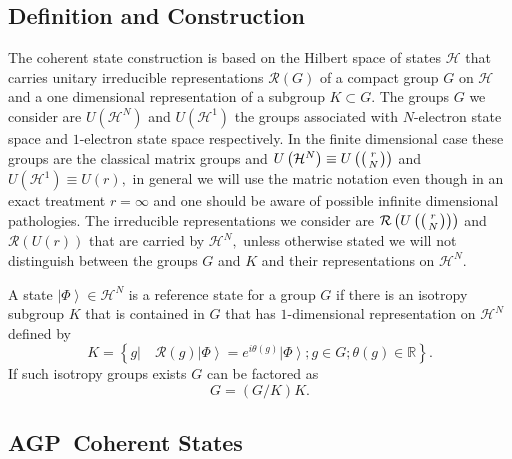 \documentclass[aps,preprint]{revtex4}%
\begin{document}
\subsection{Definition and Construction\label{def}}

The coherent state construction is based on the Hilbert space of states
$\mathcal{H}$ that carries unitary irreducible representations $\mathcal{R}%
\left(  G\right)  $ of a compact group $G$ on $\mathcal{H}$ and a one
dimensional representation of a subgroup $K\subset G$. The groups $G$ we
consider are $U\left(  \mathcal{H}^{N}\right)  $ and $U\left(  \mathcal{H}%
^{1}\right)  $ the groups associated with $N$-electron state space and
$1$-electron state space respectively. In the finite dimensional case these
groups are the classical matrix groups and $U\left(  \mathcal{H}^{N}\right)
\equiv U\left(  \left(
\genfrac{}{}{0pt}{}{r}{N}%
\right)  \right)  $ and $U\left(  \mathcal{H}^{1}\right)  \equiv U\left(
r\right)  ,$ in general we will use the matric notation even though in an
exact treatment $r=\infty$ and one should be aware of possible infinite
dimensional pathologies. The irreducible representations we consider are
$\mathcal{R}\left(  U\left(  \left(
\genfrac{}{}{0pt}{}{r}{N}%
\right)  \right)  \right)  $ and $\mathcal{R}\left(  U\left(  r\right)
\right)  $ that are carried by $\mathcal{H}^{N},$ unless otherwise stated we
will not distinguish between the groups $G$ and $K$ and their representations
on $\mathcal{H}^{N}$.

A state $\left\vert \Phi\right\rangle \in\mathcal{H}^{N}$ is a reference state
for a group $G$ if there is an isotropy subgroup $K$ that is contained in $G$
that has $1$-dimensional representation on $\mathcal{H}^{N}$ defined by
\begin{equation}
K=\left\{  \left.  g\right\vert \quad\mathcal{R}\left(  g\right)  \left\vert
\Phi\right\rangle =e^{i\theta\left(  g\right)  }\left\vert \Phi\right\rangle
;g\in G;\theta\left(  g\right)  \in\mathbb{R}\right\}  . \label{subgpcon}%
\end{equation}
If such isotropy groups exists $G$ can be factored as%
\begin{equation}
G=\left(  G/K\right)  K.
\end{equation}


\subsection{AGP\ Coherent States}
\end{document}
